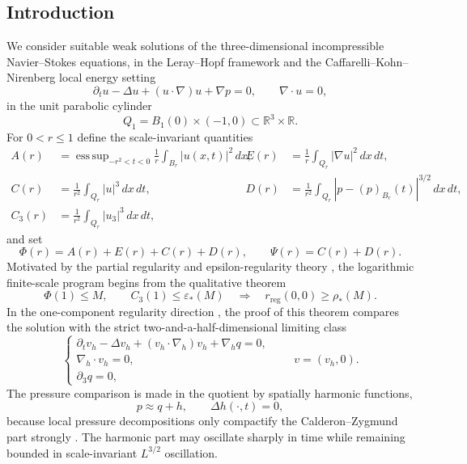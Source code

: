 \documentclass[11pt]{article}
\numberwithin{equation}{section}
\theoremstyle{plain}
\theoremstyle{definition}
\theoremstyle{remark}
\DeclareMathOperator*{\esssup}{ess\,sup}
\newcommand{\R}{\mathbb R}
\newcommand{\eps}{\varepsilon}
\newcommand{\reg}{\mathrm{reg}}
\newcommand{\dx}{\,dx}
\newcommand{\dxdt}{\,dx\,dt}
\begin{document}
\subsection{Introduction}

We consider suitable weak solutions of the three-dimensional incompressible Navier--Stokes equations, in the Leray--Hopf framework and the Caffarelli--Kohn--Nirenberg local energy setting \cite{Leray1934,Hopf1951,CKN1982}
\begin{equation}\label{pII:eq:NS}
        \partial_tu-\Delta u+(u\cdot\nabla)u+\nabla p=0,
        \qquad \nabla\cdot u=0,
\end{equation}
in the unit parabolic cylinder
\[
        Q_1=B_1(0)\times(-1,0)\subset\R^3\times\R .
\]
For $0<r\le1$ define the scale-invariant quantities
\begin{align*}
A(r)&=\esssup_{-r^2<t<0}\frac1r\int_{B_r}|u(x,t)|^2\dx,
&
E(r)&=\frac1r\int_{Q_r}|\nabla u|^2\dxdt,\\
C(r)&=\frac1{r^2}\int_{Q_r}|u|^3\dxdt,
&
D(r)&=\frac1{r^2}\int_{Q_r}|p-(p)_{B_r}(t)|^{3/2}\dxdt,\\
C_3(r)&=\frac1{r^2}\int_{Q_r}|u_3|^3\dxdt,
\end{align*}
and set
\[
        \Phi(r)=A(r)+E(r)+C(r)+D(r),
        \qquad
        \Psi(r)=C(r)+D(r).
\]
Motivated by the partial regularity and epsilon-regularity theory \cite{CKN1982,Lin1998,LadyzhenskayaSeregin1999,Seregin2007Local,Vasseur2007,Seregin2015}, the logarithmic finite-scale program begins from the qualitative theorem
\[
        \Phi(1)\le M,
        \qquad
        C_3(1)\le\eps_*(M)
        \quad\Longrightarrow\quad
        r_{\reg}(0,0)\ge \rho_*(M).
\]
In the one-component regularity direction \cite{KukavicaZiane2006,KukavicaZiane2007,CheminZhang2016,CheminZhangZhang2017,HanLeiLiZhao2019,KangNguyen2023}, the proof of this theorem compares the solution with the strict two-and-a-half-dimensional limiting class
\begin{equation}\label{pII:eq:strict-system}
\begin{cases}
\partial_t v_h-\Delta v_h+(v_h\cdot\nabla_h)v_h+\nabla_h q=0,\\
\nabla_h\cdot v_h=0,\\
\partial_3q=0,
\end{cases}
\qquad v=(v_h,0).
\end{equation}
The pressure comparison is made in the quotient by spatially harmonic functions,
\[
        p\approx q+h,
        \qquad \Delta h(\cdot,t)=0,
\]
because local pressure decompositions only compactify the Calderon--Zygmund part strongly \cite{SohrWahl1986,SereginSverak2002,Seregin2015,Wolf2017}.  The harmonic part may oscillate sharply in time while remaining bounded in scale-invariant $L^{3/2}$ oscillation.
\end{document}
